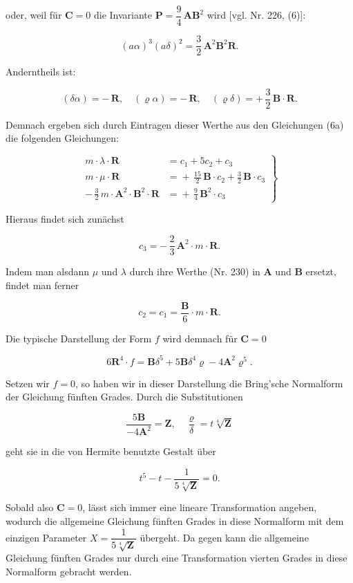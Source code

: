 \documentclass[11pt]{article}
\providecommand{\weberpage}[1]{}
\providecommand{\weq}[2]{\begin{equation}\tag{#1}#2\end{equation}}
\begin{document}
oder, weil für $\mathbf{C} = 0$ die Invariante $\mathbf{P} = \dfrac94\,\mathbf{A}\mathbf{B}^2$ wird [vgl. Nr. 226, (6)]:

\weq{9}{
(a\alpha)^3(a\delta)^2 = \frac32\,\mathbf{A}^2\mathbf{B}^2\mathbf{R}.
}

Anderntheils ist:

\[
(\delta\alpha) = -\,\mathbf{R}, \quad (\varrho\alpha) = -\,\mathbf{R}, \quad (\varrho\delta) = +\,\frac32\,\mathbf{B}\cdot\mathbf{R}.
\]

Demnach ergeben sich durch Eintragen dieser Werthe aus den
Gleichungen (6a) die folgenden Gleichungen:

\weq{10}{
\left.
\begin{aligned}
m\cdot\lambda\cdot\mathbf{R} &= c_1 + 5c_2 + c_3\\
m\cdot\mu\cdot\mathbf{R} &= {}+\,\frac{15}{2}\,\mathbf{B}\cdot c_2 + \frac32\,\mathbf{B}\cdot c_3\\
-\,\frac32\,m\cdot\mathbf{A}^2\cdot\mathbf{B}^2\cdot\mathbf{R} &= {}+\,\frac94\,\mathbf{B}^2\cdot c_3
\end{aligned}
\right\}
}

Hieraus findet sich zunächst

\[
c_3 = -\,\frac23\,\mathbf{A}^2\cdot m\cdot\mathbf{R}.
\]


\weberpage{260}
Indem man alsdann $\mu$ und $\lambda$ durch ihre Werthe (Nr. 230) in $\mathbf{A}$
und $\mathbf{B}$ ersetzt, findet man ferner

\[
c_2 = c_1 = \frac{\mathbf{B}}{6}\cdot m\cdot\mathbf{R}.
\]

Die typische Darstellung der Form $f$ wird demnach für $\mathbf{C} = 0$

\weq{11}{
6\mathbf{R}^4\cdot f = \mathbf{B}\delta^5 + 5\mathbf{B}\delta^4\varrho - 4\mathbf{A}^2\varrho^5.
}

Setzen wir $f = 0$, so haben wir in dieser Darstellung die
\glqq Bring'sche\grqq{} Normalform der Gleichung fünften Grades. Durch die
Substitutionen

\[
\frac{5\mathbf{B}}{-4\mathbf{A}^2} = \mathbf{Z}, \quad \frac{\varrho}{\delta} = t\sqrt[4]{\mathbf{Z}}
\]

geht sie in die von Hermite benutzte Gestalt über

\[
t^5 - t - \frac{1}{5\sqrt[4]{\mathbf{Z}}} = 0.
\]

Sobald also $\mathbf{C} = 0$, lässt sich immer eine lineare Transformation
angeben, wodurch die allgemeine Gleichung fünften Grades in diese
Normalform mit dem einzigen Parameter $X = \dfrac{1}{5\sqrt[4]{\mathbf{Z}}}$ übergeht. Da\-
gegen kann die allgemeine Gleichung fünften Grades nur durch eine
Transformation vierten Grades in diese Normalform gebracht werden.
\end{document}
